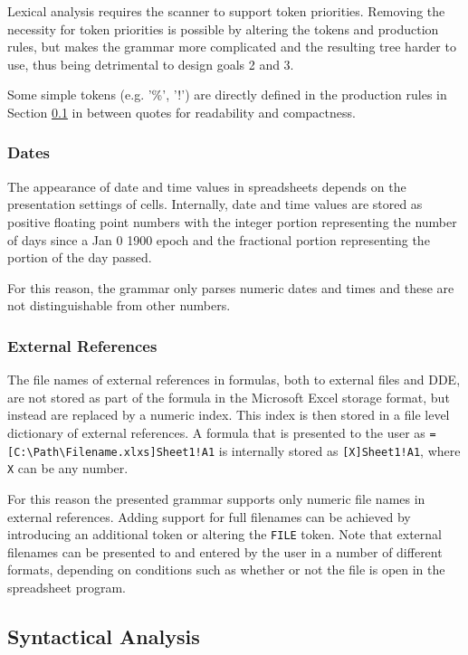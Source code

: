 \documentclass[times]{smrauth}
\begin{document}
Lexical analysis requires the scanner to support token priorities. Removing the necessity for token priorities is possible by altering the tokens and production rules, but makes the grammar more complicated and the resulting tree harder to use, thus being detrimental to design goals 2 and 3.

Some simple tokens (e.g. '\%', '!') are directly defined in the production rules in Section \ref{subsection:productionRules} in between quotes for readability and compactness.

\subsubsection{\textbf{Dates}}

The appearance of date and time values in spreadsheets depends on the presentation settings of cells. Internally, date and time values are stored as positive floating point numbers with the integer portion representing the number of days since a Jan 0 1900 epoch and the fractional portion representing the portion of the day passed.

For this reason, the grammar only parses numeric dates and times and these are not distinguishable from other numbers.

\subsubsection{\textbf{External References}}
\label{section:externalReferences}
The file names of external references in formulas, both to external files and DDE, are not stored as part of the formula in the Microsoft Excel storage format, but instead are replaced by a numeric index.
This index is then stored in a file level dictionary of external references.
A formula that is presented to the user as \texttt{=[C:\textbackslash Path\textbackslash Filename.xlxs]Sheet1!A1} is internally stored as \texttt{[X]Sheet1!A1}, where \texttt{X} can be any number.

For this reason the presented grammar supports only numeric file names in external references.
Adding support for full filenames can be achieved by introducing an additional token or altering the \texttt{FILE} token. Note that external filenames can be presented to and entered by the user in a number of different formats, depending on conditions such as whether or not the file is open in the spreadsheet program.

\subsection{Syntactical Analysis}
\label{subsection:productionRules}
\end{document}
